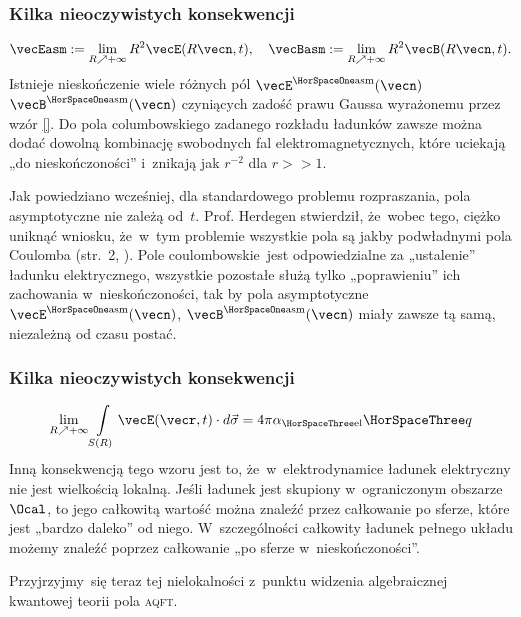 \documentclass[10pt,t]{beamer}
\begin{document}
\begin{frame}
  \frametitle{Kilka nieoczywistych konsekwencji}

  \vspace{-1.5em}


  \begin{equation}
    \label{eq:Efekt-Casimira-01}
    \vecEasm :=
    \lim_{ R \nearrow +\infty } R^{ 2 } \vecE( R \vecn, t ), \quad
    \vecBasm :=
    \lim_{ R \nearrow +\infty } R^{ 2 } \vecB( R \vecn, t ).
  \end{equation}
  Istnieje nieskończenie wiele różnych pól
  $\vecE^{ \HorSpaceOne \text{asm} }( \vecn )$
  $\vecB^{ \HorSpaceOne \text{asm} }( \vecn )$ czyniących zadość prawu Gaussa
  wyrażonemu przez wzór \eqref{}. Do pola columbowskiego zadanego rozkładu
  ładunków zawsze można dodać dowolną kombinację swobodnych fal
  elektromagnetycznych, które uciekają „do nieskończoności”
  i~znikają jak $r^{ -2 }$ dla $r >> 1$.

  Jak powiedziano wcześniej, dla standardowego problemu rozpraszania,
  pola asymptotyczne nie zależą od~$t$. Prof. Herdegen stwierdził,
  że~wobec tego, ciężko uniknąć wniosku, że~w~tym problemie wszystkie pola
  są jakby podwładnymi pola Coulomba (str.~2,
  \parencite{Herdegen-Infrared-structure-beyond-locality-ETC-Ver-2024}).
  Pole coulombowskie~jest odpowiedzialne za „ustalenie” ładunku
  elektrycznego, wszystkie pozostałe służą tylko „poprawieniu” ich
  zachowania w~nieskończoności, tak by pola asymptotyczne
  $\vecE^{ \HorSpaceOne \text{asm} }( \vecn )$,
  $\vecB^{ \HorSpaceOne \text{asm} }( \vecn )$ miały zawsze tą samą,
  niezależną od czasu postać.

\end{frame}





\begin{frame}
  \frametitle{Kilka nieoczywistych konsekwencji}


  \begin{equation}
    \label{eq:Efekt-Casimira-01}
    \lim_{ R \nearrow +\infty } \int\limits_{ S( R ) } \vecE( \vecr, t ) \cdot d\vec{ \sigma } =
    4 \pi \alpha_{ \HorSpaceThree \text{el} } \HorSpaceThree q
  \end{equation}
  Inną konsekwencją tego wzoru jest to, że~w~elektrodynamice ładunek
  elektryczny nie jest wielkością lokalną. Jeśli ładunek jest skupiony
  w~ograniczonym obszarze $\Ocal$, to jego \alert{całkowitą} wartość można
  znaleźć przez całkowanie po sferze, które jest „bardzo daleko” od niego.
  W~szczególności całkowity ładunek pełnego układu możemy znaleźć poprzez
  całkowanie „po sferze w~nieskończoności”.

  Przyjrzyjmy~się teraz tej nielokalności z~punktu widzenia algebraicznej
  kwantowej teorii pola \textsc{aqft}.

\end{frame}
\end{document}
